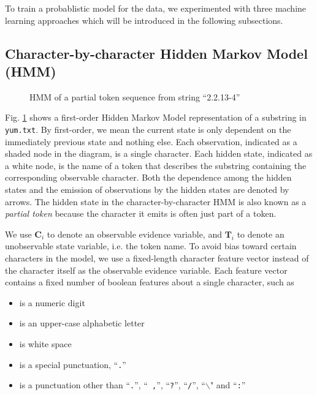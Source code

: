 To train a probablistic model for the data, we experimented with three machine learning approaches
which will be introduced in the following subsections.

\subsection{Character-by-character Hidden Markov Model (HMM)}\label{subsec:hmm}

\begin{figure}[th]
\begin{center}
\end{center}
\caption{HMM of a partial token sequence from string ``2.2.13-4''}\label{fig:hmm}
\end{figure}

Fig. \ref{fig:hmm} shows a first-order Hidden Markov
Model \cite{rabiner89:hmm} representation of a substring in {\tt yum.txt}. 
By first-order, we mean the current state is only dependent on the 
immediately previous state and nothing else.
Each observation, indicated as a shaded node in the diagram, is a single character. 
Each hidden state, indicated as a white node, 
is the name of a token that describes the substring containing the 
corresponding observable character.
Both the dependence among the hidden states and the emission of
observations by the hidden states are denoted by arrows.
The hidden state in the character-by-character HMM is also known as
a {\em partial token} because the character it emits is often just
part of a token.
 
We use $\mathbf{C}_i$ to denote an observable evidence variable, 
and $\mathbf{T}_i$ to denote an unobservable state variable, i.e. the
token name. 
To avoid bias toward certain characters in the model, we use
a fixed-length character feature vector instead of the character itself
as the observable evidence variable. Each feature vector contains a
fixed number of boolean features about a single character, such as
\begin{itemize}
\item is a numeric digit
\item is an upper-case alphabetic letter
\item is white space
\item is a special punctuation, ``{\tt .}''
\item is a punctuation other than ``{\tt .}'', ``{\tt
,}'', ``{\tt ?}'', ``{\tt /}'', ``{\tt $\backslash$}" and ``{\tt :}''
\end{itemize}

